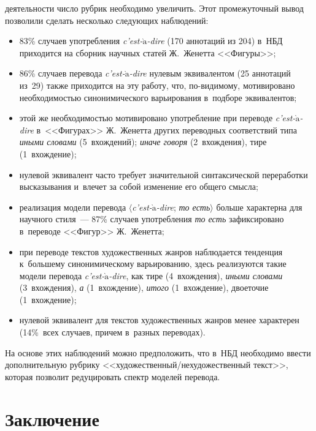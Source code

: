   \begin{multicols}{2}
  
  \noindent
    деятельности число рубрик 
необходимо увеличить. Этот промежуточный вывод позволили сделать несколько 
следующих наблюдений:
  \begin{itemize}
  \item 83\% случаев употребления \textit{c'est-$\grave{\mbox{a}}$-dire} (170 
аннотаций из 204) в~НБД приходится на сборник научных статей Ж.~Женетта 
<<Фигуры>>;
  \item 86\% случаев перевода \textit{c'est-$\grave{\mbox{a}}$-dire} нулевым 
эквивалентом (25 аннотаций из~29) также приходится на эту работу, что, 
по-ви\-ди\-мо\-му, мотивировано необходимостью синонимического \mbox{варьирования} 
в~подборе эквивалентов; 
  \item этой же необходимостью мотивировано употребление при переводе 
\textit{c'est-$\grave{\mbox{a}}$-dire} в~<<Фигурах>> Ж.~Женетта других 
переводных соответствий типа \textit{иными словами} (5~вхождений); 
\textit{иначе говоря} (2~вхождения), тире (1~вхож\-де\-ние);
  \item нулевой эквивалент часто требует значительной синтаксической 
переработки высказывания и~влечет за собой изменение его общего смысла;
  \item реализация модели перевода $\langle$\textit{c'est-$\grave{\mbox{a}}$-dire}; 
\textit{то есть}$\rangle$ больше характерна для научного стиля~--- 87\% случаев 
употребления \textit{то есть} зафиксировано в~переводе <<Фигур>> 
Ж.~Женетта;
  \item при переводе текстов художественных жанров наблюдается тенденция 
к~большему синонимическому варьированию, здесь реализуются такие модели 
перевода \textit{c'est-$\grave{\mbox{a}}$-dire}, как тире (4~вхождения), 
\textit{иными словами} (3~вхождения), \textit{а} (1~вхождение), \textit{итого} 
(1~вхождение), двоеточие (1~вхождение);
  \item нулевой эквивалент для текстов художественных жанров менее 
характерен (14\%~всех случаев, причем в~разных переводах).
  \end{itemize}
  На основе этих наблюдений можно предположить, что в~НБД необходимо 
ввести дополнительную руб\-ри\-ку 
<<ху\-до\-жест\-вен\-ный/не\-ху\-до\-жест\-вен\-ный текст>>, которая 
позволит редуцировать спектр моделей перевода.
  
  \section{Заключение}
  

\end{multicols}

